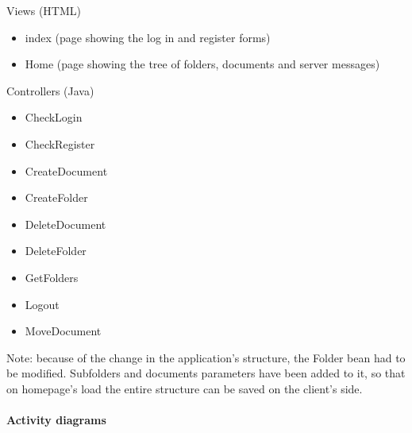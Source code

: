 \documentclass[a4paper,12pt]{article}
\begin{document}
\begin{multicols}{2}
\begin{itemize}
\end{itemize}
Views (HTML)
\begin{itemize}
	\item{index (page showing the log in and register forms)}
	\item{Home (page showing the tree of folders, documents and server messages)}
\end{itemize}
Controllers (Java)
\begin{itemize}
	\item{CheckLogin}
	\item{CheckRegister}
	\item{CreateDocument}
	\item{CreateFolder}
	\item{DeleteDocument}
	\item{DeleteFolder}
	\item{GetFolders}
	\item{Logout}
	\item{MoveDocument}
\end{itemize}
\end{multicols}
Note: because of the change in the application's structure, the Folder bean had to be modified. Subfolders and documents parameters have been added to it, so that on homepage's load the entire structure can be saved on the client's side.
\newpage 

\paragraph{Activity diagrams}\mbox{}
\end{document}

